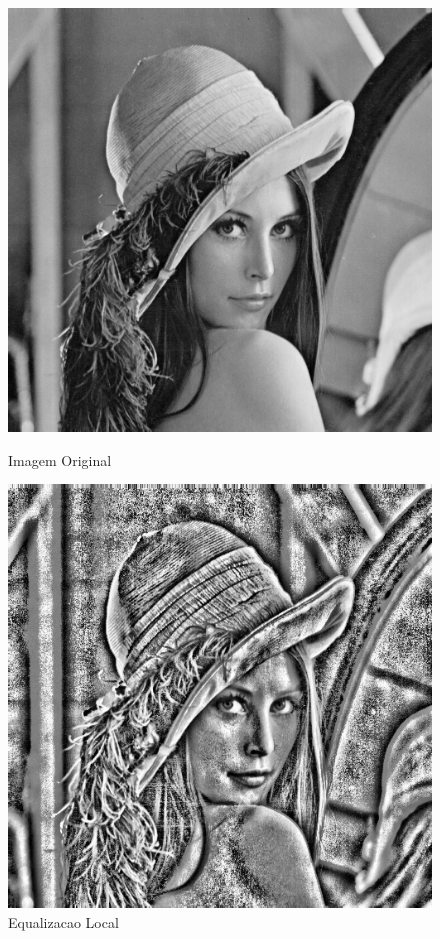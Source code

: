 \documentclass{article}
\begin{document}
\newpage
\begin{figure}[!htb]
\begin{minipage}[b]{0.45\linewidth}
\centering
\includegraphics[scale=0.32]{lena_B.png}
\caption{Imagem Original}
\label{fig:original}
\end{minipage}
\hspace{0.5cm}
\begin{minipage}[b]{0.45\linewidth}
\centering
\includegraphics[scale=0.32]{EqLocal.png}
\caption{Equalizacao Local}
\label{fig:rota}
\end{minipage}
\end{figure}
\end{document}
